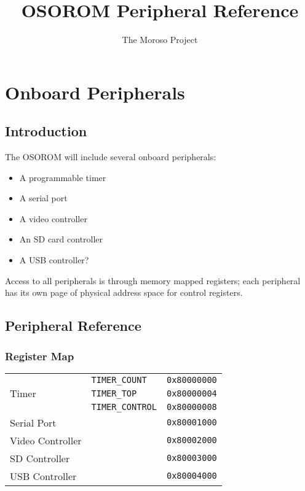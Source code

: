 \documentclass[11pt,openany]{report}
\title{OSOROM Peripheral Reference}
\author{The Moroso Project}
\begin{document}
\maketitle
\tableofcontents

\chapter{Onboard Peripherals}

\section{Introduction}
The OSOROM will include several onboard peripherals:
\begin{itemize}
\item A programmable timer
\item A serial port
\item A video controller
\item An SD card controller
\item A USB controller?
\end{itemize}

Access to all peripherals is through memory mapped registers; each
peripheral has its own page of physical address space for control
registers.

\section{Peripheral Reference}
\subsection{Register Map}
\centering
\begin{tabular}{|l|l|l|}
  \hline
  \multirow{3}{*}{Timer} & \verb|TIMER_COUNT| & \texttt{0x80000000} \\
  & \verb|TIMER_TOP| & \texttt{0x80000004} \\
  & \verb|TIMER_CONTROL| & \texttt{0x80000008} \\
  \hline
  Serial Port & & \texttt{0x80001000} \\
  \hline
  Video Controller & & \texttt{0x80002000} \\
  \hline
  SD Controller & & \texttt{0x80003000} \\
  \hline
  USB Controller & & \texttt{0x80004000} \\
  \hline
\end{tabular}
\end{document}
